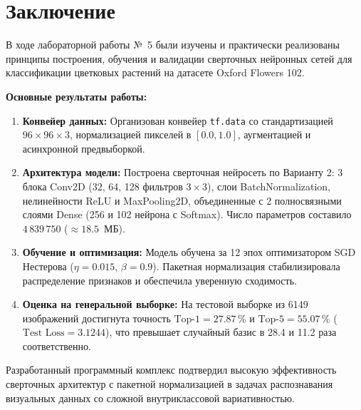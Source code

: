 \chapter*{Заключение}

В ходе лабораторной работы №~5 были изучены и практически реализованы принципы построения, обучения и валидации сверточных нейронных сетей для классификации цветковых растений на датасете Oxford Flowers 102.

\textbf{Основные результаты работы:}
\begin{enumerate}[itemsep=1pt, parsep=0pt, topsep=1pt]
    \item \textbf{Конвейер данных:} Организован конвейер \texttt{tf.data} со стандартизацией $96 \times 96 \times 3$, нормализацией пикселей в $[0.0, 1.0]$, аугментацией и асинхронной предвыборкой.
    \item \textbf{Архитектура модели:} Построена сверточная нейросеть по Варианту 2: 3 блока Conv2D (32, 64, 128 фильтров $3 \times 3$), слои BatchNormalization, нелинейности ReLU и MaxPooling2D, объединенные с 2 полносвязными слоями Dense (256 и 102 нейрона с Softmax). Число параметров составило $4\,839\,750$ ($\approx 18.5$~МБ).
    \item \textbf{Обучение и оптимизация:} Модель обучена за 12 эпох оптимизатором SGD Нестерова ($\eta = 0.015$, $\beta = 0.9$). Пакетная нормализация стабилизировала распределение признаков и обеспечила уверенную сходимость.
    \item \textbf{Оценка на генеральной выборке:} На тестовой выборке из 6149 изображений достигнута точность $\text{Top-1} = 27.87\,\%$ и $\text{Top-5} = 55.07\,\%$ ($\text{Test Loss} = 3.1244$), что превышает случайный базис в 28.4 и 11.2 раза соответственно.
\end{enumerate}

Разработанный программный комплекс подтвердил высокую эффективность сверточных архитектур с пакетной нормализацией в задачах распознавания визуальных данных со сложной внутриклассовой вариативностью.

